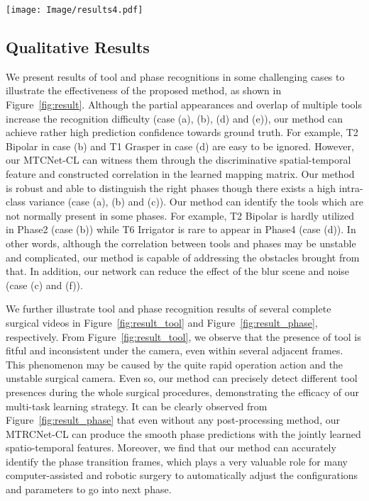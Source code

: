 \documentclass{elsarticle}
\begin{document}
		
		\begin{figure*}[t]
			\centering
			\texttt{[image: Image/results4.pdf]}
\caption{Typical results of the proposed MTRCNet-CL for tool presence detection and phase recognition. For tool, the labels and the probability predictions towards ground truths are indicated through white arrows; and for phase, they are present below each frame.}
			\label{fig:result}
\end{figure*}
		
\subsection{Qualitative Results}
We present results of tool and phase recognitions in some challenging cases to illustrate the effectiveness of the proposed method, as shown in Figure~\ref{fig:result}.
Although the partial appearances and overlap of multiple tools increase the recognition difficulty (case (a), (b), (d) and (e)), 
our method can achieve rather high prediction confidence towards ground truth.
For example, T2 Bipolar in case (b) and T1 Grasper in case (d) are easy to be ignored.
However, our MTCNet-CL can witness them through the discriminative spatial-temporal feature and constructed correlation in the learned mapping matrix.
Our method is robust and able to distinguish the right phases though there exists a high intra-class variance (case (a), (b) and (c)).
Our method can identify the tools which are not normally present in some phases.
For example, T2 Bipolar is hardly utilized in Phase2 (case (b)) while T6 Irrigator is rare to appear in Phase4 (case (d)).
In other words, although the correlation between tools and phases may be unstable and complicated, our method is capable of addressing the obstacles brought from that.
In addition, our network can reduce the effect of the blur scene and noise (case (c) and (f)).



		
		
		
We further illustrate tool and phase recognition results of several complete surgical videos in Figure~\ref{fig:result_tool} and Figure~\ref{fig:result_phase}, respectively.  
From Figure~\ref{fig:result_tool}, we observe that the presence of tool is fitful and inconsistent under the camera, even within several adjacent frames. 
This phenomenon may be caused by the quite rapid operation action and the unstable surgical camera.
Even so, our method can precisely detect different tool presences during the whole surgical procedures, demonstrating the efficacy of our multi-task learning strategy.
It can be clearly observed from Figure~\ref{fig:result_phase} that even without any post-processing method, our MTRCNet-CL can produce the smooth phase predictions with the jointly learned spatio-temporal features.
Moreover, we find that our method can accurately identify the phase transition frames, which plays a very valuable role for many computer-assisted and robotic surgery to automatically adjust the configurations and parameters to go into next phase.
\end{document}

